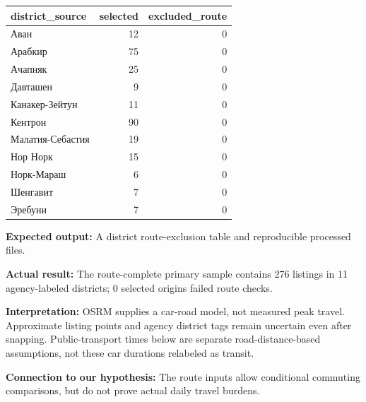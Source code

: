 \documentclass[
]{article}
\newenvironment{Shaded}{\begin{snugshade}}{\end{snugshade}}
\newcommand{\FunctionTok}[1]{\textcolor[rgb]{0.13,0.29,0.53}{\textbf{#1}}}
\newcommand{\NormalTok}[1]{#1}
\newcommand{\OtherTok}[1]{\textcolor[rgb]{0.56,0.35,0.01}{#1}}
\newcommand{\SpecialCharTok}[1]{\textcolor[rgb]{0.81,0.36,0.00}{\textbf{#1}}}
\newcommand{\StringTok}[1]{\textcolor[rgb]{0.31,0.60,0.02}{#1}}
\newcounter{none} %
\begin{document}
{\def\LTcaptype{none} %
\begin{longtable}[]{@{}lrr@{}}
\toprule\noalign{}
district\_source & selected & excluded\_route \\
\midrule\noalign{}
\endhead
\bottomrule\noalign{}
\endlastfoot
Аван & 12 & 0 \\
Арабкир & 75 & 0 \\
Ачапняк & 25 & 0 \\
Давташен & 9 & 0 \\
Канакер-Зейтун & 11 & 0 \\
Кентрон & 90 & 0 \\
Малатия-Себастия & 19 & 0 \\
Нор Норк & 15 & 0 \\
Норк-Мараш & 6 & 0 \\
Шенгавит & 7 & 0 \\
Эребуни & 7 & 0 \\
\end{longtable}
}

\begin{Shaded}
\end{Shaded}

\textbf{Expected output:} A district route-exclusion table and
reproducible processed files.

\textbf{Actual result:} The route-complete primary sample contains 276
listings in 11 agency-labeled districts; 0 selected origins failed route
checks.

\textbf{Interpretation:} OSRM supplies a car-road model, not measured
peak travel. Approximate listing points and agency district tags remain
uncertain even after snapping. Public-transport times below are separate
road-distance-based assumptions, not these car durations relabeled as
transit.

\textbf{Connection to our hypothesis:} The route inputs allow
conditional commuting comparisons, but do not prove actual daily travel
burdens.
\end{document}

